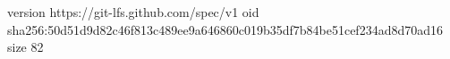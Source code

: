 version https://git-lfs.github.com/spec/v1
oid sha256:50d51d9d82c46f813c489ee9a646860c019b35df7b84be51cef234ad8d70ad16
size 82
